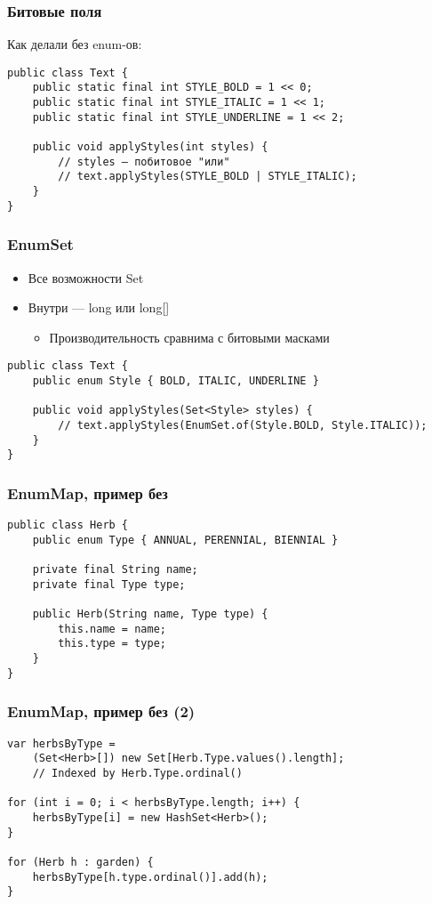 \documentclass[xetex,mathserif,serif]{beamer}
\begin{document}
	\begin{frame}[fragile]
		\frametitle{Битовые поля}
		Как делали без enum-ов:

		\begin{verbatim}
public class Text {
    public static final int STYLE_BOLD = 1 << 0;
    public static final int STYLE_ITALIC = 1 << 1;
    public static final int STYLE_UNDERLINE = 1 << 2;
   
    public void applyStyles(int styles) {
        // styles — побитовое "или"
        // text.applyStyles(STYLE_BOLD | STYLE_ITALIC);
    }
}
		\end{verbatim}
	\end{frame}

	\begin{frame}[fragile]
		\frametitle{EnumSet}
		\begin{itemize}
			\item Все возможности Set
			\item Внутри --- long или long[]
			\begin{itemize}
				\item Производительность сравнима с битовыми масками
			\end{itemize}
		\end{itemize}
		\vspace{4mm}
		\begin{verbatim}
public class Text {
    public enum Style { BOLD, ITALIC, UNDERLINE }
    
    public void applyStyles(Set<Style> styles) {
        // text.applyStyles(EnumSet.of(Style.BOLD, Style.ITALIC));
    }
}
		\end{verbatim}
	\end{frame}

	\begin{frame}[fragile]
		\frametitle{EnumMap, пример без}
		\begin{verbatim}
public class Herb {
    public enum Type { ANNUAL, PERENNIAL, BIENNIAL }
    
    private final String name;
    private final Type type;
    
    public Herb(String name, Type type) {
        this.name = name;
        this.type = type;
    }
}
		\end{verbatim}
	\end{frame}

	\begin{frame}[fragile]
		\frametitle{EnumMap, пример без (2)}
		\begin{verbatim}
var herbsByType = 
    (Set<Herb>[]) new Set[Herb.Type.values().length];
    // Indexed by Herb.Type.ordinal()

for (int i = 0; i < herbsByType.length; i++) {
    herbsByType[i] = new HashSet<Herb>();
}

for (Herb h : garden) {
    herbsByType[h.type.ordinal()].add(h);
}
		\end{verbatim}
	\end{frame}
\end{document}
